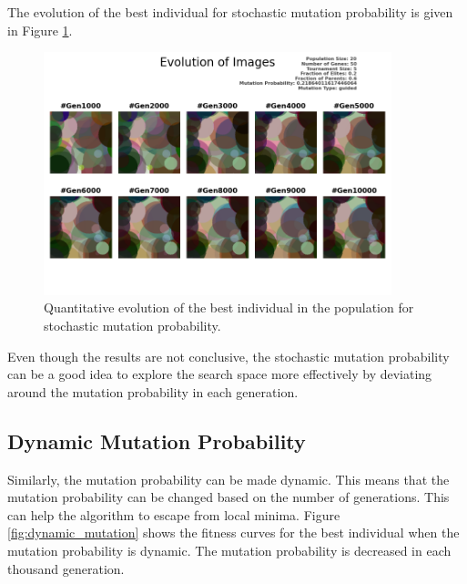 \documentclass{assignment}
\begin{document}
The evolution of the best individual for stochastic mutation probability is given in Figure \ref{fig:stochastic_mutation_image}.
\begin{figure}[!htb]
    \centering
    \includegraphics[width=0.9\textwidth]{figures/images_outputSTOC_20_50_5_0.2_0.6_0.21864011617446064_guided.png}
    \caption{Quantitative evolution of the best individual in the population for stochastic mutation probability.}
    \label{fig:stochastic_mutation_image}
\end{figure}

Even though the results are not conclusive, the stochastic mutation probability can be a good idea to explore the search space more effectively by deviating around the mutation probability in each generation.

\subsection{Dynamic Mutation Probability}
Similarly, the mutation probability can be made dynamic. This means that the mutation probability can be changed based on the number of generations. This can help the algorithm to escape from local minima. Figure \ref{fig:dynamic_mutation} shows the fitness curves for the best individual when the mutation probability is dynamic. The mutation probability is decreased in each thousand generation.
\end{document}
